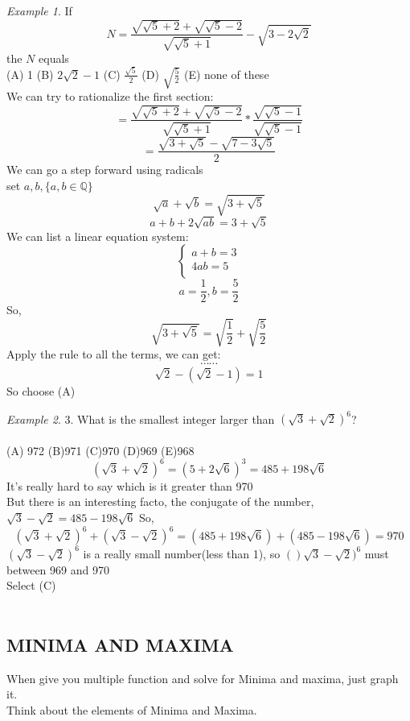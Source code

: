\documentclass[10pt]{article}
\theoremstyle{remark}
\newtheorem*{example}{Example}
\begin{document}
\begin{example}
	If 
	\[
		N = \frac{ \sqrt{ \sqrt{5} + 2} + \sqrt{\sqrt{ 5 } - 2} }{ \sqrt{ \sqrt{5} + 1 } } - {\sqrt{ 3 - 2\sqrt{2}}}
	\]
	the $N$ equals\\
	(A) 1  (B) $2\sqrt{2} - 1$  (C) $\frac{\sqrt{5}}{2}$  (D) $\sqrt{\frac{5}{2}}$  (E) none of these\\
	We can try to rationalize the first section:
	\[
		=\frac{ \sqrt{ \sqrt{5} + 2} + \sqrt{\sqrt{ 5 } - 2} }{ \sqrt{ \sqrt{5} + 1 } } * \frac{\sqrt{\sqrt{5} - 1}}{\sqrt{\sqrt{5} - 1}}
	\]
	\[
		=\frac{\sqrt{3 + \sqrt{5}} - \sqrt{7 - 3\sqrt{5}}}{2}
	\]
	We can go a step forward using radicals\\
	set $a, b, \{a, b \in \mathbb{Q}\}$
	\[
		\sqrt{a} + \sqrt{b} = \sqrt{3 + \sqrt{5}}
	\]
	\[
		a + b + 2\sqrt{ab} = 3 + \sqrt{5}
	\]
	We can list a linear equation system: 
	\[
		\left\{\begin{matrix}
		 a + b = 3\\
		 4ab = 5 \\
		\end{matrix}\right.
	\]
	\[
		a = \frac{1}{2}, b = \frac{5}{2}
	\]
	So,
	\[
		\sqrt{3 + \sqrt{5}} = \sqrt{\frac{1}{2}} + \sqrt{\frac{5}{2}}
	\]
	Apply the rule to all the terms, we can get:
	\[
		\cdots \cdots
	\]
	\[
		\sqrt{2} - (\sqrt{2} - 1) = 1
	\]
	So choose (A)\\
\end{example}

\begin{example}
	3. What is the smallest integer larger than $(\sqrt{3} + \sqrt{2})^6$?\\
	\\
	(A) 972 (B)971 (C)970 (D)969 (E)968
	\[
		(\sqrt{3} + \sqrt{2})^6 = (5 + 2\sqrt{6})^3 = 485 + 198\sqrt{6}
	\]
	It's really hard to say which is it greater than 970\\
	But there is an interesting facto, the conjugate of the number, $\sqrt{3} - \sqrt{2} = 485 - 198\sqrt{6}$
	So,
	\[
		(\sqrt{3} + \sqrt{2})^6 + (\sqrt{3} - \sqrt{2})^6  = (485 + 198\sqrt{6}) + (485 - 198\sqrt{6}) = 970
	\]
	$(\sqrt{3} - \sqrt{2})^6$ is a really small number(less than 1), so $()\sqrt{3} - \sqrt{2})^6$ must between 969 and 970\\ 
	Select (C)\\ 
	\\
\end{example}

\subsection{MINIMA AND MAXIMA}
When give you multiple function and solve for Minima and maxima, just graph it.\\
Think about the elements of Minima and Maxima.\\
\end{document}

